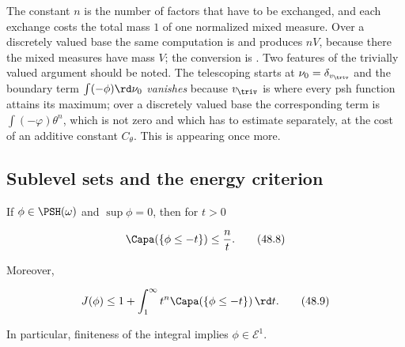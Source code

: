 \begin{remark}
\label{rem:ch48-cln-constant}
The constant $n$ is the number of factors that have to be exchanged, and
each exchange costs the total mass $1$ of one normalized mixed measure.
Over a discretely valued base the same computation is
 and produces $nV$, because there the mixed
measures have mass $V$; the conversion is
.  Two features of the trivially valued
argument should be noted.  The telescoping starts at
$\nu_0=\delta_{v_{\triv}}$ and the boundary term
$\int(-\phi)\rd\nu_0$ \emph{vanishes} because $v_{\triv}$ is where every
psh function attains its maximum; over a discretely valued base the
corresponding term is $\int(-\varphi)\theta^n$, which is not zero and
which  has to estimate separately, at the
cost of an additive constant $C_\theta$.  This is
 appearing once more.
\end{remark}

\subsection{Sublevel sets and the energy criterion}
\label{sec:ch48-sublevel}

\begin{proposition}\label{prop:bj-capacity-sublevel}
If $\phi\in\PSH(\omega)$ and $\sup\phi=0$, then for $t>0$

\[
                  \Capa(\{\phi\leq-t\})\leq \frac nt.
\tag{48.8}\label{eq:bj-cap-sublevel-bound}
\]

Moreover,

\[
 J(\phi)\leq 1+\int_1^\infty t^n
             \Capa(\{\phi\leq-t\})\,\rd t.
\tag{48.9}\label{eq:bj-cap-energy-criterion}
\]

In particular, finiteness of the integral implies
$\phi\in\mathcal E^1$.
\end{proposition}


